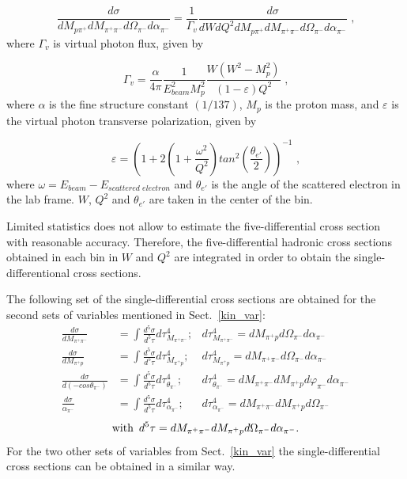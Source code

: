 \begin{equation}
\frac{d\sigma}{dM_{p\pi^{+}}dM_{\pi^{+}\pi^{-}}d\Omega_{\pi^{-}}
d\alpha_{\pi^{-}}} = \frac{1}{\Gamma_{v}}
\frac{d\sigma}{dWdQ^{2}dM_{p\pi^{+}}dM_{\pi^{+}\pi^{-}}d\Omega_{\pi^{-}}
d\alpha_{\pi^{-}}}  \textrm{ ,}
\label{fulldiff}
\end{equation}
where $\Gamma_{v}$ is 
virtual photon flux, given by

\begin{equation}
\Gamma_{v} =
\frac{\alpha}{4\pi}\frac{1}{E_{beam}^{2}M_{p}^{2}}\frac{W(W^{2}-M_{p}^{2})}
{(1-\varepsilon)Q^{2}} \textrm{ ,}
\label{flux}
\end{equation}
where $\alpha$ is the fine structure constant $\left(1/137\right)$, $M_{p}$ is the proton
mass, and $\varepsilon$ is the virtual photon transverse polarization, given by

\begin{equation}
\varepsilon = \left( 1 + 2\left( 1 +
\frac{\omega^{2}}{Q^{2}} \right)
tan^{2}\left(\frac{\theta_{e'}}{2}\right) \right)^{-1} \textrm{ ,}
\label{polarization}
\end{equation}
where $\omega = E_{beam} - E_{scattered \,\, electron}$ and
$\theta_{e'}$ is the angle of the scattered electron in the
lab frame. $W$, $Q^{2}$ and $\theta_{e'}$ are
taken in the center of the bin.

Limited
statistics does not allow to estimate
the five-differential cross section with reasonable
accuracy. Therefore, the five-differential hadronic cross sections obtained in each bin in $W$ and $Q^2$ are integrated in order to obtain the single-differentional cross sections.


The following set of the single-differential cross sections are obtained for the second sets of variables mentioned in Sect.~\ref{kin_var}:
\begin{equation}
\begin{aligned}
\frac{d\sigma}{dM_{\pi^{+}\pi^{-}}} & =
\int\frac{d^{5}\sigma}{d^{5}\tau}d\tau_{M_{\pi^{+}\pi^{-}}}^{4}; & 
 d\tau_{M_{\pi^{+}\pi^{-}}}^{4} =
dM_{\pi^{+}p}d\Omega_{\pi^{-}}d\alpha_{\pi^{-}} \\
\frac{d\sigma}{dM_{\pi^{+}p}} & =
\int\frac{d^{5}\sigma}{d^{5}\tau}d\tau_{M_{\pi^{+}p}}^{4}; & 
d\tau_{M_{\pi^{+}p}}^{4} =
dM_{\pi^{+}\pi^{-}}d\Omega_{\pi^{-}}d\alpha_{\pi^{-}} \\
\frac{d\sigma}{d(-cos\theta_{\pi^{-}})} & =
\int\frac{d^{5}\sigma}{d^{5}\tau}d\tau_{\theta_{\pi^{-}}}^{4}; & 
d\tau_{\theta_{\pi^{-}}}^{4} =
dM_{\pi^{+}\pi^{-}}dM_{\pi^{+}p}d\varphi_{\pi^{-}}d\alpha_{\pi^{-}} \\
\frac{d\sigma}{\alpha_{\pi^{-}}} & =
\int\frac{d^{5}\sigma}{d^{5}\tau}d\tau_{\alpha_{\pi^{-}}}^{4}; & 
d\tau_{\alpha_{\pi^{-}}}^{4} =
dM_{\pi^{+}\pi^{-}}dM_{\pi^{+}p}d\Omega_{\pi^{-}}
\end{aligned}
\label{inegr5diff}
\end{equation}
$$
\text{with\,\,\,} d^{5}\tau = dM_{\pi^{+}\pi^{-}}dM_{\pi^{+}p}d\Omega_{\pi^{-}}d\alpha_{\pi^{-}}. 
$$
For the two other sets of variables from Sect.~\ref{kin_var} the single-differential cross sections can be obtained in a similar way.



